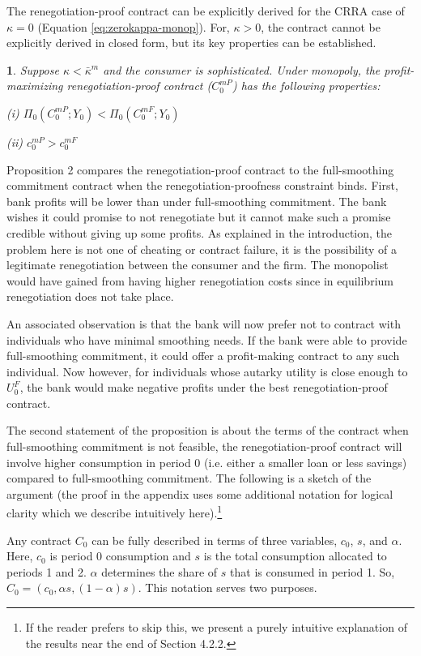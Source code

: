 \documentclass[11pt,english]{article}
\theoremstyle{plain}
\newtheorem{prop}{\protect\propositionname}
\theoremstyle{definition}
\providecommand{\propositionname}{Proposition}
\begin{document}
The renegotiation-proof contract can be explicitly derived for the
CRRA case of $\kappa=0$ (Equation \ref{eq:zerokappa-monop}). For,
$\kappa>0$, the contract cannot be explicitly derived in closed form,
but its key properties can be established.
\begin{prop}
Suppose $\kappa<\bar{\kappa}^{m}$ and the consumer is sophisticated.
Under monopoly, the profit-maximizing renegotiation-proof contract
($C_{0}^{mP}$) has the following properties:

(i) $\Pi_{0}\left(C_{0}^{mP};Y_{0}\right)<\Pi_{0}\left(C_{0}^{mF};Y_{0}\right)$ 

(ii) $c_{0}^{mP}>c_{0}^{mF}$
\end{prop}
Proposition 2 compares the renegotiation-proof contract to the full-smoothing
commitment contract when the renegotiation-proofness constraint binds.
First, bank profits will be lower than under full-smoothing commitment.
The bank wishes it could promise to not renegotiate but it cannot
make such a promise credible without giving up some profits. As explained
in the introduction, the problem here is not one of cheating or contract
failure, it is the possibility of a legitimate renegotiation between
the consumer and the firm. The monopolist would have gained from having
higher renegotiation costs since in equilibrium renegotiation does
not take place.

An associated observation is that the bank will now prefer not to
contract with individuals who have minimal smoothing needs. If the
bank were able to provide full-smoothing commitment, it could offer
a profit-making contract to any such individual. Now however, for
individuals whose autarky utility is close enough to $U_{0}^{F}$,
the bank would make negative profits under the best renegotiation-proof
contract.

The second statement of the proposition is about the terms of the
contract \textendash{} when full-smoothing commitment is not feasible,
the renegotiation-proof contract will involve higher consumption in
period 0 (i.e. either a smaller loan or less savings) compared to
full-smoothing commitment. The following is a sketch of the argument
(the proof in the appendix uses some additional notation for logical
clarity which we describe intuitively here).\footnote{If the reader prefers to skip this, we present a purely intuitive
explanation of the results near the end of Section 4.2.2.} 

Any contract $C_{0}$ can be fully described in terms of three variables,
$c_{0}$, $s$, and $\alpha$. Here, $c_{0}$ is period 0 consumption
and $s$ is the total consumption allocated to periods 1 and 2. $\alpha$
determines the share of $s$ that is consumed in period 1. So, $C_{0}=\left(c_{0},\alpha s,\left(1-\alpha\right)s\right)$.
This notation serves two purposes.
\end{document}
